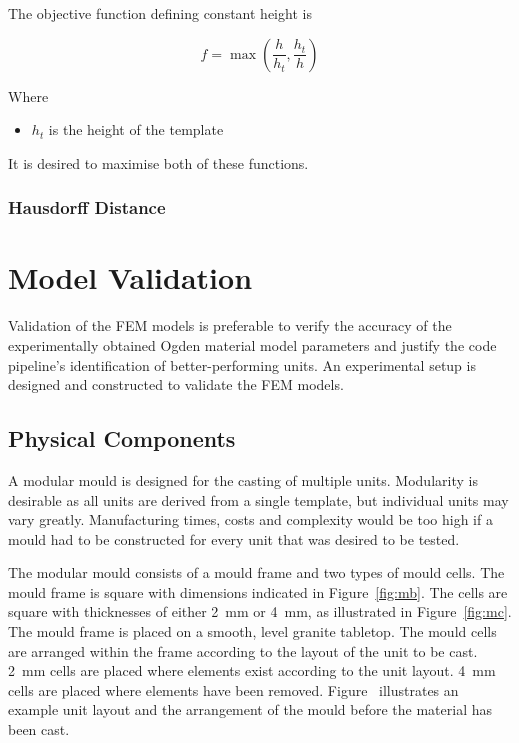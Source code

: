 The objective function defining constant height is

\begin{equation}
	f=\max\left (\frac{h}{h_{t}},\frac{h_{t}}{h} \right )
\end{equation}

Where

\begin{itemize}
	\item $h_{t}$ is the height of the template
\end{itemize}

It is desired to maximise both of these functions.

\subsubsection{Hausdorff Distance}
\label{ssec:Hd}

\section{Model Validation}
\label{sec:TP}

Validation of the FEM models is preferable to verify the accuracy of the experimentally obtained Ogden material model parameters and justify the code pipeline's identification of better-performing units. An experimental setup is designed and constructed to validate the FEM models.

\subsection{Physical Components}

A modular mould is designed for the casting of multiple units. Modularity is desirable as all units are derived from a single template, but individual units may vary greatly. Manufacturing times, costs and complexity would be too high if a mould had to be constructed for every unit that was desired to be tested.

The modular mould consists of a mould frame and two types of mould cells. The mould frame is square with dimensions indicated in Figure~\ref{fig:mb}. The cells are square with thicknesses of either \SI{2}{mm} or \SI{4}{mm}, as illustrated in Figure~\ref{fig:mc}. The mould frame is placed on a smooth, level granite tabletop. The mould cells are arranged within the frame according to the layout of the unit to be cast. \SI{2}{mm} cells are placed where elements exist according to the unit layout. \SI{4}{mm} cells are placed where elements have been removed. Figure~ illustrates an example unit layout and the arrangement of the mould before the material has been cast.

